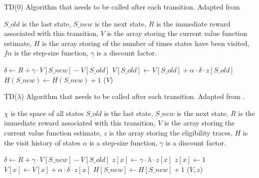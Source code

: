 \begin{algorithm}
  \caption{
  TD(0) Algorithm that needs to be called after each transition. 
  Adapted from \textcite{Szepesvari2010ai+algorithms}
  \label{algorithm:td:0}}

  \begin{algorithmic}[1]
    \Require 
      \Statex $S\_old$ is the last state,
      \Statex $S\_new$ is the next state,
      \Statex $R$ is the immediate reward associated with this transition,
      \Statex $V$ is the array storing the current value function estimate,
      \Statex $H$ is the array storing of the number of times states have
              been visited,
      \Statex $f\alpha$ is the step-size function,
      \Statex $\gamma$ is a discount factor.

      \State $\delta \gets R + \gamma \cdot V[S\_new] - V[S\_old]$
      \State $V[S\_old] \gets V[S\_old] + \alpha \cdot \delta \cdot z[S\_old]$
      \State $H(S\_new) \gets H(S\_new) + 1$
      \State \Return ($V$)
    \EndFunction
  \end{algorithmic}
\end{algorithm}


\begin{algorithm}
  \caption{
  TD(\(\lambda\)) Algorithm that needs to be called after each transition. 
  Adapted from \textcite{Szepesvari2010ai+algorithms}.
  \label{algorithm:td:lambda}}

  \begin{algorithmic}[1]
    \Require 
      \Statex $\chi$ is the space of all states
      \Statex $S\_old$ is the last state,
      \Statex $S\_new$ is the next state,
      \Statex $R$ is the immediate reward associated with this transition,
      \Statex $V$ is the array storing the current value function estimate,
      \Statex $z$ is the array storing the eligibility traces,
      \Statex $H$ is the visit history of states
      \Statex $\alpha$ is a step-size function,
      \Statex $\gamma$ is a discount factor.


      \State $\delta \gets R + \gamma \cdot V[S\_new] - V[S\_old]$
        \State $z[x] \gets \gamma \cdot \lambda \cdot z[x]$
          \State $z[x] \gets 1$
        \EndIf
        \State $V[x] \gets V[x] + \alpha \cdot \delta \cdot z[x]$
      \EndFor
      \State $H[S\_new] \gets H[S\_new] + 1$
      \State \Return ($V,z$)
    \EndFunction
  \end{algorithmic}

\end{algorithm}



